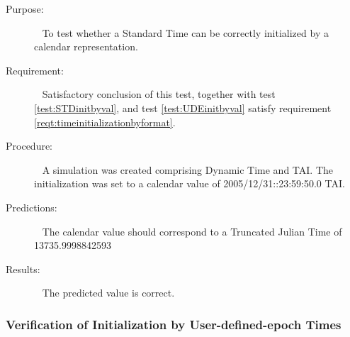   \label{test:STDinitbycal}
\begin{description}
\item[Purpose:]\ \newline
To test whether a Standard Time can be correctly initialized by a calendar representation.

\item[Requirement:]\ \newline
Satisfactory conclusion of this test, together with test \ref{test:STDinitbyval}, and test \ref{test:UDEinitbyval} satisfy requirement \ref{reqt:timeinitializationbyformat}.


\item[Procedure:]\ \newline
A simulation was created comprising Dynamic Time and TAI.  The initialization was set to a calendar value of 2005/12/31::23:59:50.0 TAI. 

\item[Predictions:]\ \newline
The calendar value should correspond to a Truncated Julian Time of 13735.9998842593

\item[Results:]\ \newline
The predicted value is correct.

\end{description}



\subsubsection{Verification of Initialization by User-defined-epoch Times}


